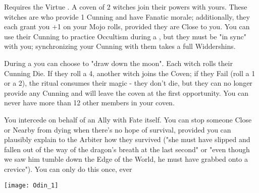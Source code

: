 {\begin{multicols*}{2}
{    \item {}  Requires the Virtue .  A coven of 2 witches join their powers with yours.  These witches are  who provide 1 Cunning and have Fanatic morale; additionally, they each grant you +1 on your Mojo rolls, provided they are Close to you. You can use their Cunning to practice Occultism during a , but they must be "in sync" with you; synchronizing your Cunning with them takes a full Widdershins. 

During a  you can choose to "draw down the moon".  Each witch rolls their Cunning Die.  If they roll a 4, another witch joins the Coven; if they Fail (roll a 1 or a 2), the ritual consumes their magic - they don't die, but they can no longer provide any Cunning and will leave the coven at the first opportunity.  You can never have more than 12 other members in your coven.  

    \item  {}  You intercede on behalf of an Ally with Fate itself.  You can stop someone Close or Nearby from dying when there's no hope of survival, provided you can plausibly explain to the Arbiter how they survived ("she must have slipped and fallen out of the way of the dragon's breath at the last second" or "even though we saw him tumble down the Edge of the World, he must have grabbed onto a crevice").  You can only do this once, ever 
  }

\begin{center}
  \texttt{[image: Odin\_1]}
\end{center}



  \cbreak


\end{multicols*}}
